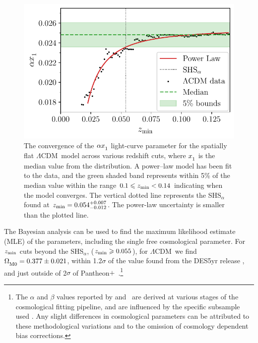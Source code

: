 \documentclass[fleqn,usenatbib]{mnras}
\newcommand{\pplus}{Pantheon$+$}
\newcommand{\LA}{\Lambda}
\newcommand{\LCDM}{$\LA$CDM}
\newcommand{\lcdm}{spatially flat $\LA$CDM}
\newcommand{\laneetal}{\citet{Lane_2023}}
\newcommand{\Z}[1]{_{\lower2pt\hbox{$\scriptstyle#1$}}}
\newcommand{\Ns}[1]{_{\lower2pt\hbox{$\scriptstyle\rm#1$}}}
\newcommand{\ns}[1]{_{\rm #1}}
\newcommand{\zmin}{z\ns{min}}
\begin{document}
\begin{figure}
    \includegraphics[width=\columnwidth]{images/power_law_shs_std.pdf}
    \caption{The convergence of the $\alpha x\Z 1$ light-curve parameter for the \lcdm\ model across various redshift cuts, where $x \Z 1$ is the median value from the distribution. A power--law model has been fit to the data, and the green shaded band represents within 5\% of the median value within the range $0.1 \leq \zmin < 0.14$ indicating when the model converges. The vertical dotted line represents the SHS$_\alpha$ found at $\zmin = 0.054^{+0.007}_{-0.012}$. The power-law uncertainty is smaller than the plotted line.}
    \label{fig:shs}
\end{figure}

The Bayesian analysis can be used to find the maximum likelihood estimate (MLE) of the parameters, including the single free cosmological parameter. For $\zmin$ cuts beyond the SHS$_\alpha$, ($\zmin \geq 0.055$), for \LCDM\ we find $\Omega\Ns{M0}= 0.377 \pm 0.021$, within 1.2$\sigma$ of the value found from the DES5yr release \citep{DES_2024}, and just outside of 2$\sigma$ of \pplus\ \citep{Brout_2022_cosmo}.\footnote{The $\alpha$ and $\beta$ values reported by \citet{Scolnic_2022} and \laneetal\ are derived at various stages of the cosmological fitting pipeline, and are influenced by the specific subsample used \citep{Lane_2023}. Any slight differences in cosmological parameters can be attributed to these methodological variations and to the omission of cosmology dependent bias corrections.}
\end{document}
